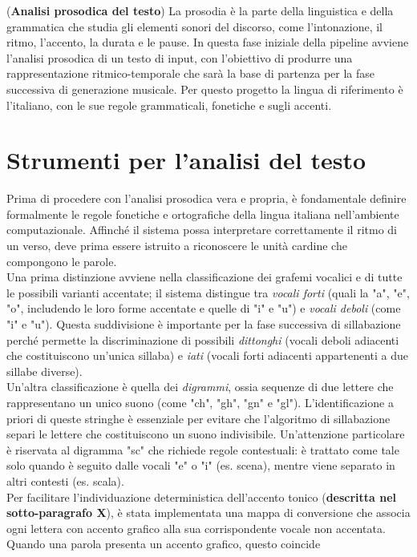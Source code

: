 
(\textbf{Analisi prosodica del testo})
La prosodia è la parte della linguistica e della grammatica che studia gli elementi sonori del discorso, come l'intonazione, il ritmo, l'accento, 
la durata e le pause. In questa fase iniziale della pipeline avviene l'analisi prosodica di un testo di input, con l'obiettivo di produrre 
una rappresentazione ritmico-temporale che sarà la base di partenza per la fase successiva di generazione musicale. 
Per questo progetto la lingua di riferimento è l'italiano, con le sue regole grammaticali, fonetiche e sugli accenti. 

\section{Strumenti per l'analisi del testo}
Prima di procedere con l'analisi prosodica vera e propria, è fondamentale definire formalmente le regole fonetiche e ortografiche della lingua italiana
nell'ambiente computazionale. Affinché il sistema possa interpretare correttamente il ritmo di un verso, deve prima essere istruito a riconoscere 
le unità cardine che compongono le parole.\\
Una prima distinzione avviene nella classificazione dei grafemi vocalici e di tutte le possibili varianti accentate; il sistema distingue tra 
\textit{vocali forti} (quali la "a", "e", "o", includendo le loro forme accentate e quelle di "i" e "u") e \textit{vocali deboli} (come "i" e "u"). 
Questa suddivisione è importante per la fase successiva di sillabazione perché permette la discriminazione di possibili \textit{dittonghi} (vocali deboli 
adiacenti che costituiscono un'unica sillaba) e \textit{iati} (vocali forti adiacenti appartenenti a due sillabe diverse).\\
Un'altra classificazione è quella dei \textit{digrammi}, ossia sequenze di due lettere che rappresentano un unico suono (come "ch", "gh", "gn" e "gl"). 
L'identificazione a priori di queste stringhe è essenziale per evitare che l'algoritmo di sillabazione separi le lettere che costituiscono un suono 
indivisibile. Un'attenzione particolare è riservata al digramma "sc" che richiede regole contestuali: è trattato come tale solo quando è seguito dalle 
vocali "e" o "i" (es. scena), mentre viene separato in altri contesti (es. scala).\\
Per facilitare l'individuazione deterministica dell'accento tonico (\textbf{descritta nel sotto-paragrafo X}), è stata implementata una mappa di conversione che 
associa ogni lettera con accento grafico alla sua corrispondente vocale non accentata. Quando una parola presenta un accento grafico, questo coincide 
